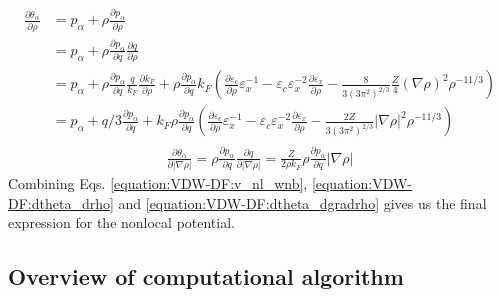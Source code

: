 \documentclass[letterpaper,10pt,english]{sphinxmanual}
\begin{document}
\label{\detokenize{VDW-DF:equation-dtheta-drho}}\begin{equation}\label{equation:VDW-DF:dtheta_drho}
\begin{split}\begin{aligned}
    {\frac{\partial{\theta_\alpha}}{\partial{\rho}}} &=p_\alpha + \rho {\frac{\partial{p_\alpha}}{\partial{\rho}}} \nonumber \\
                                               &=p_\alpha + \rho {\frac{\partial{p_\alpha}}{\partial{q}}}{\frac{\partial{q}}{\partial{\rho}}} \nonumber \\
                                               &=p_\alpha + \rho {\frac{\partial{p_\alpha}}{\partial{q}}} \frac{q}{k_F} {\frac{\partial{k_F}}{\partial{\rho}}} + \rho {\frac{\partial{p_\alpha}}{\partial{q}}} k_F ({\frac{\partial{{\varepsilon}_c}}{\partial{\rho}}}{\varepsilon}_x^{-1}-{\varepsilon}_c{\varepsilon}_x^{-2}{\frac{\partial{{\varepsilon}_x}}{\partial{\rho}}} - \frac{8}{3(3\pi^2)^{2/3}}\frac{Z}{4}(\nabla\rho)^2 \rho^{-11/3}) \nonumber \\
                                               &=p_\alpha + q/3{\frac{\partial{p_\alpha}}{\partial{q}}} + k_F\rho {\frac{\partial{p_\alpha}}{\partial{q}}} ({\frac{\partial{{\varepsilon}_c}}{\partial{\rho}}}{\varepsilon}_x^{-1}-{\varepsilon}_c{\varepsilon}_x^{-2}{\frac{\partial{{\varepsilon}_x}}{\partial{\rho}}}- \frac{2Z}{3(3\pi^2)^{2/3}} {|\nabla{\rho}|}^2\rho^{-11/3})\end{aligned}\end{split}
\end{equation}\label{\detokenize{VDW-DF:equation-dtheta-dgradrho}}\begin{equation}\label{equation:VDW-DF:dtheta_dgradrho}
\begin{split}    {\frac{\partial{\theta_\alpha}}{\partial{{|\nabla{\rho}|}}}} = \rho {\frac{\partial{p_\alpha}}{\partial{q}}} {\frac{\partial{q}}{\partial{{|\nabla{\rho}|}}}} = \frac{Z}{2\rho k_F} \rho {\frac{\partial{p_\alpha}}{\partial{q}}}{|\nabla{\rho}|}\end{split}
\end{equation}
Combining Eqs. \eqref{equation:VDW-DF:v_nl_wnb}, \eqref{equation:VDW-DF:dtheta_drho} and \eqref{equation:VDW-DF:dtheta_dgradrho} gives
us the final expression for the nonlocal potential.


\subsection{Overview of computational algorithm}
\label{\detokenize{VDW-DF:overview-of-computational-algorithm}}
\end{document}
